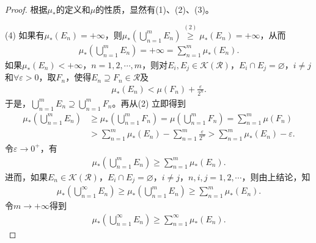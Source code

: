 \documentclass[../../main.tex]{subfiles}%
\begin{document}
\begin{proof}

根据$\mu_*$的定义和$\mu$的性质，显然有(1)、(2)、(3)。

(4) 如果有$\mu_*(E_n)=+\infty$，则$\mu_*\left(\bigcup\limits_{n=1}^{m}E_n\right)\overset{(2)}{\geqslant} \mu_*(E_n)=+\infty$，从而
\begin{align*}
\mu_*\left(\bigcup\limits_{n=1}^{m}E_n\right)=+\infty = \sum\limits_{n=1}^{m}\mu_*(E_n).
\end{align*}
如果$\mu_*(E_n)<+\infty$，$n=1,2,\cdots,m$，则对$E_i,E_j\in\mathscr{K}(\mathscr{R})$，$E_i\cap E_j=\varnothing$，$i\neq j$和$\forall\varepsilon>0$，取$F_n$，使得$E_n\supseteq F_n\in\mathscr{R}$及
\begin{align*}
\mu_*(E_n) < \mu(F_n) + \frac{\varepsilon}{2^n}.
\end{align*}
于是，$\bigcup\limits_{n=1}^{m}E_n \supseteq \bigcup\limits_{n=1}^{m}F_n$。再从(2) 立即得到
\begin{align*}
\mu_*\left(\bigcup\limits_{n=1}^{m}E_n\right) &\geqslant \mu_*\left(\bigcup\limits_{n=1}^{m}F_n\right) = \mu\left(\bigcup\limits_{n=1}^{m}F_n\right) = \sum\limits_{n=1}^{m}\mu(F_n) \\
&> \sum\limits_{n=1}^{m}\mu_*(E_n) - \sum\limits_{n=1}^{m}\frac{\varepsilon}{2^n} > \sum\limits_{n=1}^{m}\mu_*(E_n) - \varepsilon.
\end{align*}
令$\varepsilon\to 0^+$，有
\begin{align*}
\mu_*\left(\bigcup\limits_{n=1}^{m}E_n\right)\geqslant \sum\limits_{n=1}^{m}\mu_*(E_n).
\end{align*}
进而，如果$E_n\in\mathscr{K}(\mathscr{R})$，$E_i\cap E_j=\varnothing$，$i\neq j$，$n,i,j=1,2,\cdots$，则由上结论，知
\begin{align*}
\mu_*\left(\bigcup\limits_{n=1}^{\infty}E_n\right)\geqslant \mu_*\left(\bigcup\limits_{n=1}^{m}E_n\right)\geqslant \sum\limits_{n=1}^{m}\mu_*(E_n).
\end{align*}
令$m\to+\infty$得到
\begin{align*}
\mu_*\left(\bigcup\limits_{n=1}^{\infty}E_n\right)\geqslant \sum\limits_{n=1}^{\infty}\mu_*(E_n).
\end{align*}


\end{proof}
\end{document}
